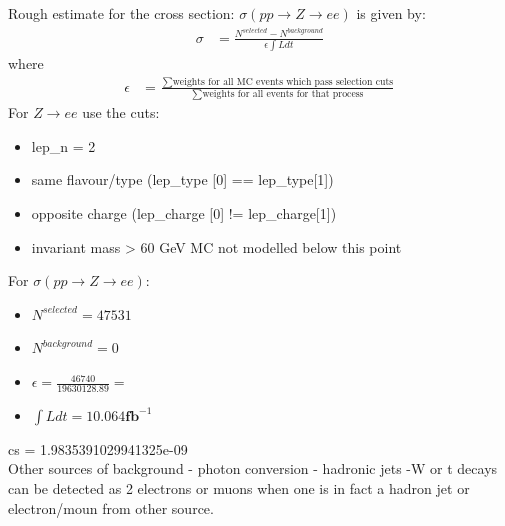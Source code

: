 Rough estimate for the cross section: $\sigma (pp \rightarrow Z \rightarrow ee)$ is given by:
\begin{align}
    \sigma &= \frac{N^{selected} - N^{background}}{\epsilon \int L dt}
\end{align}
where
\begin{align}
     \epsilon &= \frac{\sum \text{weights for all MC events which pass selection cuts}}{\sum \text{weights for all events for that process}} 
\end{align}
For $Z \rightarrow ee$ use the cuts:
\begin{itemize}
    \item lep\_n = 2
    \item same flavour/type (lep\_type [0] == lep\_type[1])
    \item opposite charge (lep\_charge [0] != lep\_charge[1])
    \item invariant mass > 60 GeV 
    \subitem MC not modelled below this point
\end{itemize}
For $\sigma (pp \rightarrow Z \rightarrow ee)$:
\begin{itemize}
    \item $N^{selected} = 47531$
    \item $N^{background} = 0$
    \item $\epsilon = \frac{46740}{19630128.89} = $
    \item $\int L dt = 10.064 \textbf{fb}^{-1}$
\end{itemize}


cs = 1.9835391029941325e-09
\\
Other sources of background 
 - photon conversion 
 - hadronic jets
 -W or t decays can be detected as 2 electrons or muons when one is in fact a hadron jet or electron/moun from other source. 
 
